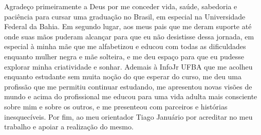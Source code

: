 \begin{agradecimentos}
Agradeço primeiramente a Deus por me conceder vida, saúde, sabedoria e paciência para cursar uma graduação no Brasil, em especial na Universidade Federal da Bahia. Em segundo lugar, aos meus pais que me deram suporte até onde suas mãos puderam alcançar para que eu não desistisse dessa jornada, em especial à minha mãe que me alfabetizou e educou com todas as dificuldades enquanto mulher negra e mãe solteira, e me deu espaço para que eu pudesse explorar minha criatividade e sonhar. Ademais à InfoJr UFBA que me acolheu enquanto estudante sem muita noção do que esperar do curso, me deu uma profissão que me permitiu continuar estudando, me apresentou novas visões de mundo e acima do profissional me educou para uma vida adulta mais consciente sobre mim e sobre os outros, e me presenteou com parceiros e histórias inesquecíveis. Por fim, ao meu orientador Tiago Januário por acreditar no meu trabalho e apoiar a realização do mesmo.

\end{agradecimentos}
